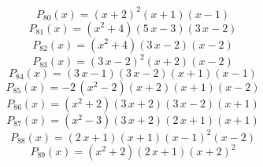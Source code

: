 \subitem \begin{dmath*}P_{80}(x) = {\left(x + 2\right)}^{2} {\left(x + 1\right)} {\left(x - 1\right)} \end{dmath*}\vspace{- 1.20000000000000 cm}
\subitem \begin{dmath*}P_{81}(x) = {\left(x^{2} + 4\right)} {\left(5 \, x - 3\right)} {\left(3 \, x - 2\right)} \end{dmath*}\vspace{- 1.20000000000000 cm}
\subitem \begin{dmath*}P_{82}(x) = {\left(x^{2} + 4\right)} {\left(3 \, x - 2\right)} {\left(x - 2\right)} \end{dmath*}\vspace{- 1.20000000000000 cm}
\subitem \begin{dmath*}P_{83}(x) = {\left(3 \, x - 2\right)}^{2} {\left(x + 2\right)} {\left(x - 2\right)} \end{dmath*}\vspace{- 1.20000000000000 cm}
\subitem \begin{dmath*}P_{84}(x) = {\left(3 \, x - 1\right)} {\left(3 \, x - 2\right)} {\left(x + 1\right)} {\left(x - 1\right)} \end{dmath*}\vspace{- 1.20000000000000 cm}
\subitem \begin{dmath*}P_{85}(x) = -2 \, {\left(x^{2} - 2\right)} {\left(x + 2\right)} {\left(x + 1\right)} {\left(x - 2\right)} \end{dmath*}\vspace{- 1.20000000000000 cm}
\subitem \begin{dmath*}P_{86}(x) = {\left(x^{2} + 2\right)} {\left(3 \, x + 2\right)} {\left(3 \, x - 2\right)} {\left(x + 1\right)} \end{dmath*}\vspace{- 1.20000000000000 cm}
\subitem \begin{dmath*}P_{87}(x) = {\left(x^{2} - 3\right)} {\left(3 \, x + 2\right)} {\left(2 \, x + 1\right)} {\left(x + 1\right)} \end{dmath*}\vspace{- 1.20000000000000 cm}
\subitem \begin{dmath*}P_{88}(x) = {\left(2 \, x + 1\right)} {\left(x + 1\right)} {\left(x - 1\right)}^{2} {\left(x - 2\right)} \end{dmath*}\vspace{- 1.20000000000000 cm}
\subitem \begin{dmath*}P_{89}(x) = {\left(x^{2} + 2\right)} {\left(2 \, x + 1\right)} {\left(x + 2\right)}^{2} \end{dmath*}\vspace{- 1.20000000000000 cm}
